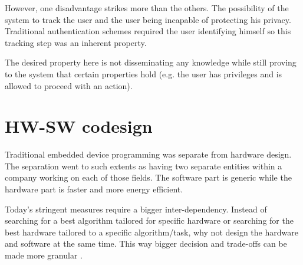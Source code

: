 However, one disadvantage strikes more than the others. The
possibility of the system to track the user and the user being
incapable of protecting his privacy. Traditional authentication
schemes required the user identifying himself so this tracking step
was an inherent property.

The desired property here is not disseminating any knowledge while
still proving to the system that certain properties hold (e.g. the
user has privileges and is allowed to proceed with an action).

\section{HW-SW codesign}

Traditional embedded device programming was separate from hardware
design. The separation went to such extents as having two separate
entities within a company working on each of those fields. The
software part is generic while the hardware part is faster and more
energy efficient.

Today's stringent measures require a bigger inter-dependency. Instead
of searching for a best algorithm tailored for specific hardware or
searching for the best hardware tailored to a specific algorithm/task,
why not design the hardware and software at the same time. This way
bigger decision and trade-offs can be made more granular
\cite{softeninghw}.

